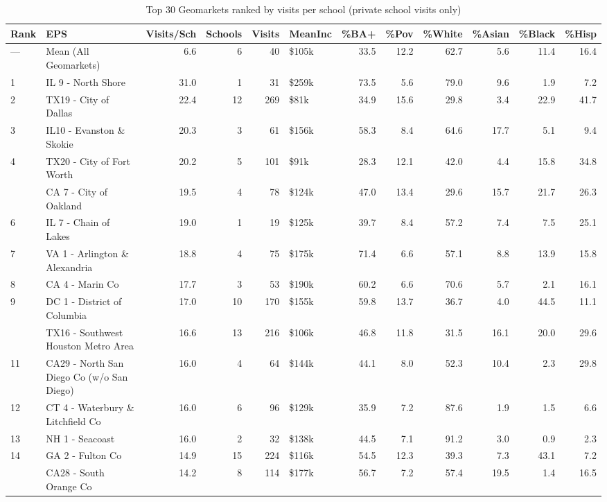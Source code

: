 \begin{table}
\centering
\caption{Top 30 Geomarkets ranked by visits per school (private school visits only)}
\centering
\begin{tabular}[t]{llrrrlrrrrrr}
\toprule
Rank & EPS & Visits/Sch & Schools & Visits & MeanInc & \%BA+ & \%Pov & \%White & \%Asian & \%Black & \%Hisp\\
\midrule
— & Mean (All Geomarkets) & 6.6 & 6 & 40 & \$105k & 33.5 & 12.2 & 62.7 & 5.6 & 11.4 & 16.4\\
1 & IL 9 - North Shore & 31.0 & 1 & 31 & \$259k & 73.5 & 5.6 & 79.0 & 9.6 & 1.9 & 7.2\\
2 & TX19 - City of Dallas & 22.4 & 12 & 269 & \$81k & 34.9 & 15.6 & 29.8 & 3.4 & 22.9 & 41.7\\
3 & IL10 - Evanston \& Skokie & 20.3 & 3 & 61 & \$156k & 58.3 & 8.4 & 64.6 & 17.7 & 5.1 & 9.4\\
4 & TX20 - City of Fort Worth & 20.2 & 5 & 101 & \$91k & 28.3 & 12.1 & 42.0 & 4.4 & 15.8 & 34.8\\
\addlinespace
5 & CA 7 - City of Oakland & 19.5 & 4 & 78 & \$124k & 47.0 & 13.4 & 29.6 & 15.7 & 21.7 & 26.3\\
6 & IL 7 - Chain of Lakes & 19.0 & 1 & 19 & \$125k & 39.7 & 8.4 & 57.2 & 7.4 & 7.5 & 25.1\\
7 & VA 1 - Arlington \& Alexandria & 18.8 & 4 & 75 & \$175k & 71.4 & 6.6 & 57.1 & 8.8 & 13.9 & 15.8\\
8 & CA 4 - Marin Co & 17.7 & 3 & 53 & \$190k & 60.2 & 6.6 & 70.6 & 5.7 & 2.1 & 16.1\\
9 & DC 1 - District of Columbia & 17.0 & 10 & 170 & \$155k & 59.8 & 13.7 & 36.7 & 4.0 & 44.5 & 11.1\\
\addlinespace
10 & TX16 - Southwest Houston Metro Area & 16.6 & 13 & 216 & \$106k & 46.8 & 11.8 & 31.5 & 16.1 & 20.0 & 29.6\\
11 & CA29 - North San Diego Co (w/o San Diego) & 16.0 & 4 & 64 & \$144k & 44.1 & 8.0 & 52.3 & 10.4 & 2.3 & 29.8\\
12 & CT 4 - Waterbury \& Litchfield Co & 16.0 & 6 & 96 & \$129k & 35.9 & 7.2 & 87.6 & 1.9 & 1.5 & 6.6\\
13 & NH 1 - Seacoast & 16.0 & 2 & 32 & \$138k & 44.5 & 7.1 & 91.2 & 3.0 & 0.9 & 2.3\\
14 & GA 2 - Fulton Co & 14.9 & 15 & 224 & \$116k & 54.5 & 12.3 & 39.3 & 7.3 & 43.1 & 7.2\\
\addlinespace
15 & CA28 - South Orange Co & 14.2 & 8 & 114 & \$177k & 56.7 & 7.2 & 57.4 & 19.5 & 1.4 & 16.5\\

\end{tabular}
\end{table}
